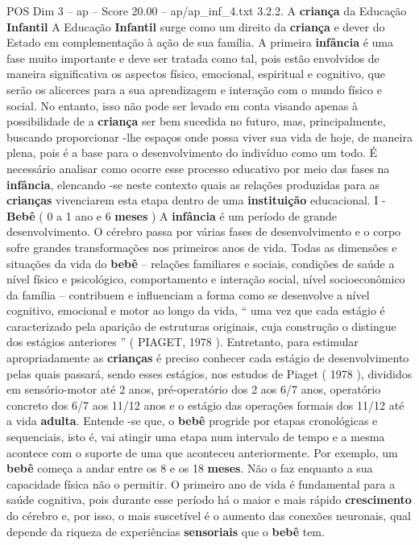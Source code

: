 \begin{textsample}{POS Dim 3 – ap – Score 20.00 – ap/ap\_inf\_4.txt}  \label{ex:f3_pos_183}
3.2.2.
A \textbf{criança} da Educação \textbf{Infantil} A Educação \textbf{Infantil} surge como um direito da \textbf{criança} e dever do Estado em complementação à ação de sua família.
A primeira \textbf{infância} é uma fase muito importante e deve ser tratada como tal, pois estão envolvidos de maneira significativa os aspectos físico, emocional, espiritual e cognitivo, que serão os alicerces para a sua aprendizagem e interação com o mundo físico e social.
No entanto, isso não pode ser levado em conta visando apenas à possibilidade de a \textbf{criança} ser bem sucedida no futuro, mas, principalmente, buscando proporcionar -lhe espaços onde possa viver sua vida de hoje, de maneira plena, pois é a base para o desenvolvimento do indivíduo como um todo.
É necessário analisar como ocorre esse processo educativo por meio das fases na \textbf{infância}, elencando -se neste contexto quais as relações produzidas para as \textbf{crianças} vivenciarem esta etapa dentro de uma \textbf{instituição} educacional.
I - \textbf{Bebê} ( 0 a 1 ano e 6 \textbf{meses} ) A \textbf{infância} é um período de grande desenvolvimento.
O cérebro passa por várias fases de desenvolvimento e o corpo sofre grandes transformações nos primeiros anos de vida.
Todas as dimensões e situações da vida do \textbf{bebê} – relações familiares e sociais, condições de saúde a nível físico e psicológico, comportamento e interação social, nível socioeconômico da família – contribuem e influenciam a forma como se desenvolve a nível cognitivo, emocional e motor ao longo da vida, “ uma vez que cada estágio é caracterizado pela aparição de estruturas originais, cuja construção o distingue dos estágios anteriores ” ( PIAGET, 1978 ).
Entretanto, para estimular apropriadamente as \textbf{crianças} é preciso conhecer cada estágio de desenvolvimento pelas quais passará, sendo esses estágios, nos estudos de Piaget ( 1978 ), divididos em sensório-motor até 2 anos, pré-operatório dos 2 aos 6/7 anos, operatório concreto dos 6/7 aos 11/12 anos e o estágio das operações formais dos 11/12 até a vida \textbf{adulta}.
Entende -se que, o \textbf{bebê} progride por etapas cronológicas e sequenciais, isto é, vai atingir uma etapa num intervalo de tempo e a mesma acontece com o suporte de uma que aconteceu anteriormente.
Por exemplo, um \textbf{bebê} começa a andar entre os 8 e os 18 \textbf{meses}.
Não o faz enquanto a sua capacidade física não o permitir.
O primeiro ano de vida é fundamental para a saúde cognitiva, pois durante esse período há o maior e mais rápido \textbf{crescimento} do cérebro e, por isso, o mais suscetível é o aumento das conexões neuronais, qual depende da riqueza de experiências \textbf{sensoriais} que o \textbf{bebê} tem.

\end{textsample}
